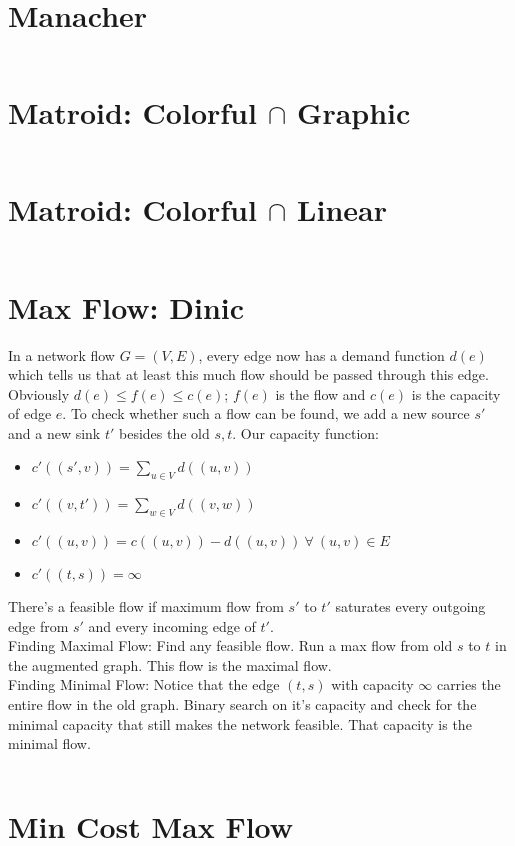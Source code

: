 \documentclass{article}
\begin{document}
\begin{multicols}{3}[
	\maketitle
    \begin{center}
        \rule{\textwidth}{2pt}
    \end{center}
]
\section{Manacher}
\inputminted{cpp}{src/Manacher.cpp}

\section{Matroid: Colorful $\cap$ Graphic}
\inputminted{cpp}{src/MatroidColorGraph.cpp}

\section{Matroid: Colorful $\cap$ Linear}
\inputminted{cpp}{src/MatroidColorfulLinear.cpp}

\section{Max Flow: Dinic}
In a network flow $G = (V, E)$, every edge now has a demand function $d(e)$ which tells us that at least this much flow should be passed through this edge. Obviously $d(e) \leq f(e) \leq c(e)$; $f(e)$ is the flow and $c(e)$ is the capacity of edge $e$. To check whether such a flow can be found, we add a new source $s'$ and a new sink $t'$ besides the old $s, t$. Our capacity function:
\begin{itemize}
    \item $c'((s', v)) = \sum_{u \in V} d((u, v))$
    \item $c'((v, t')) = \sum_{w \in V} d((v, w))$
    \item $c'((u, v)) = c((u, v)) - d((u, v)) \ \forall \ (u, v) \in E$
    \item $c'((t, s)) = \infty$
\end{itemize}
There's a feasible flow if maximum flow from $s'$ to $t'$ saturates every outgoing edge from $s'$ and every incoming edge of $t'$.\\
Finding Maximal Flow: Find any feasible flow. Run a max flow from old $s$ to $t$ in the augmented graph. This flow is the maximal flow.\\
Finding Minimal Flow: Notice that the edge $(t, s)$ with capacity $\infty$ carries the entire flow in the old graph. Binary search on it's capacity and check for the minimal capacity that still makes the network feasible. That capacity is the minimal flow.
\inputminted{cpp}{src/MaxFlowDinic.cc}

\section{Min Cost Max Flow}
\inputminted{cpp}{src/MinCostMaxFlow.cc}


\end{multicols}
\end{document}
